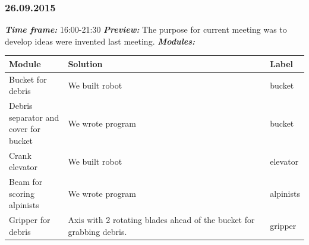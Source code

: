 \subsubsection{26.09.2015}
	\textit{\textbf{Time frame:}} 16:00-21:30 \newline
	\textit{\textbf{Preview:}} The purpose for current meeting was to develop ideas were invented last meeting.\newline \newline
	\textit{\textbf{Modules:}}

  \begin{table}[H]
	\vspace{-2mm}
	\begin{center}
		\begin{tabular}{|p{0.2\linewidth}|p{0.7\linewidth}|p{0.1\linewidth}|}
			\hline
			Module & Solution & Label \\
			\hline
			Bucket for debris & We built robot & bucket \\
			\hline
			Debris separator and cover for bucket & We wrote program & bucket \\
			\hline
			Crank elevator & We built robot & elevator \\
			\hline
			Beam for scoring alpinists & We wrote program & alpinists \\
			\hline
			Gripper for debris & Axis with 2 rotating blades ahead of the bucket for grabbing debris. & gripper \\
			\hline
		\end{tabular}
	\end{center}
  \end{table}
  
